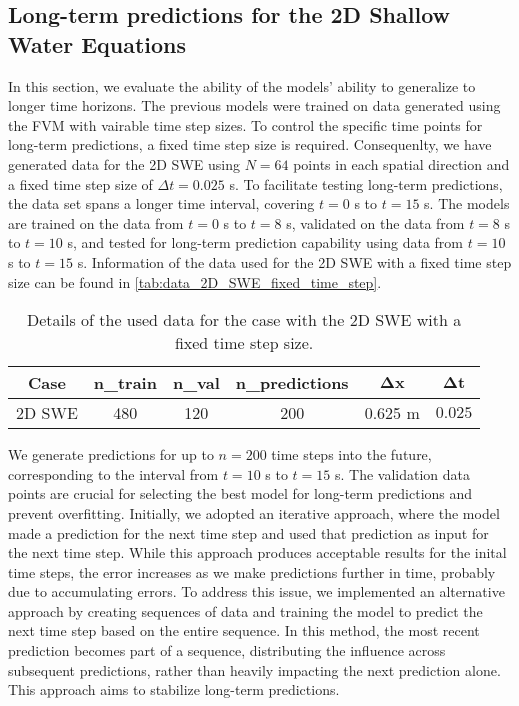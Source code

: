 \subsection{Long-term predictions for the 2D Shallow Water Equations}
In this section, we evaluate the ability of the models' ability to generalize to longer time horizons.
The previous models were trained on data generated using the FVM with vairable time step sizes.
To control the specific time points for long-term predictions, a fixed time step size is required.
Consequenlty, we have generated data for the 2D SWE using $N = 64$ points in each spatial direction and a fixed time step size of $\Delta t = 0.025$ s.
To facilitate testing long-term predictions, the data set spans a longer time interval, covering $t = 0$ s to $t = 15$ s.
The models are trained on the data from $t = 0$ s to $t = 8$ s, validated on the data from $t = 8$ s to $t = 10$ s, and tested for long-term prediction capability using data from $t = 10$ s to $t = 15$ s.
Information of the data used for the 2D SWE with a fixed time step size can be found in \autoref{tab:data_2D_SWE_fixed_time_step}.
\begin{table}[H]
    \centering
    \begin{tabular}{c|ccccc}
        \textbf{Case} & \textbf{n\_train} & \textbf{n\_val} & \textbf{n\_predictions} & $\mathbf{\Delta x}$ & $\mathbf{\Delta t}$ \\
        \hline
        2D SWE & 480 & 120 & 200 & 0.625 m  & $0.025$ \\
    \end{tabular}
    \caption{Details of the used data for the case with the 2D SWE with a fixed time step size.}\label{tab:data_2D_SWE_fixed_time_step}
\end{table}
We generate predictions for up to $n = 200$ time steps into the future, corresponding to the interval from $t = 10$ s to $t = 15$ s.
The validation data points are crucial for selecting the best model for long-term predictions and prevent overfitting.
Initially, we adopted an iterative approach, where the model made a prediction for the next time step and used that prediction as input for the next time step.
While this approach produces acceptable results for the inital time steps, the error increases as we make predictions further in time, probably due to accumulating errors.
To address this issue, we implemented an alternative approach by creating sequences of data and training the model to predict the next time step based on the entire sequence.
In this method, the most recent prediction becomes part of a sequence, distributing the influence across subsequent predictions, rather than heavily impacting the next prediction alone.
This approach aims to stabilize long-term predictions.

